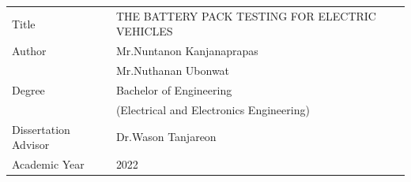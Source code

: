 %

\setcounter{page}{1}
\frontmatter
\noindent\begin{tabularx}{\linewidth}{@{}l@{\qquad}X@{}}
Title							& \parbox[t]{\linewidth}
{\strut\expandafter\uppercase\expandafter{The Battery Pack Testing For Electric Vehicles}\strut}\\
Author									& Mr.Nuntanon Kanjanaprapas\\
										& Mr.Nuthanan Ubonwat\\
Degree									& Bachelor of Engineering\\
										& (Electrical and Electronics Engineering)\\
Dissertation Advisor					& Dr.Wason Tanjareon\\
Academic Year							& 2022
\end{tabularx}

\cleardoublepage
\newpage




\cleardoublepage
\newpage






\makeatother





